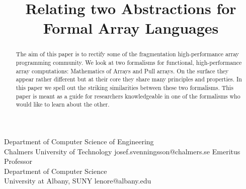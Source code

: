 \documentclass[preprint]{sigplanconf}
\begin{document}
\setlength{\pdfpageheight}{\paperheight}
\setlength{\pdfpagewidth}{\paperwidth}






\title{Relating two Abstractions for Formal Array Languages}

           {Department of Computer Science of Engineering\\Chalmers University of Technology}
           {josef.svenningsson@chalmers.se}
           {Emeritus Professor\\Department of Computer Science\\
University at Albany, SUNY}
           {lenore@albany.edu}

\maketitle

\begin{abstract}
The aim of this paper is to rectify some of the fragmentation
high-performance array programming community. We look at two
formalisms for functional, high-performance array computations:
Mathematics of Arrays and Pull arrays.  On the surface they appear
rather different but at their core they share many principles and
properties.  In this paper we spell out the striking similarities
between these two formalisms. This paper is meant as a guide for
researchers knowledgeable in one of the formalisms who would like to
learn about the other.

\end{abstract}
\end{document}
